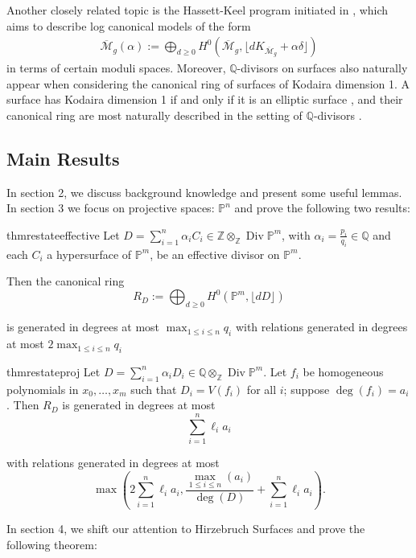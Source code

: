 \documentclass{amsart}
\theoremstyle{plain}
\theoremstyle{definition}
\theoremstyle{remark}
\numberwithin{equation}{section}
\newcommand\ssec{\subsection}
\newcommand\bq{{\mathbb Q}}
\newcommand\bp{{\mathbb P}}
\newcommand\bz{{\mathbb Z}}
\DeclareMathOperator\di{Div}
\newcommand\bida{a}
\begin{document}
Another closely related topic is the Hassett-Keel program 
initiated in \cite{hassett:classical-and-minimal-models}, which aims to describe log canonical models of the form
\begin{align*}
	\overline {\mathscr M}_g(\alpha) := \bigoplus_{d \geq 0}H^0 \left(
	\overline {\mathscr M}_g, \lfloor d K_{\overline{\mathscr M}_g} +
	\alpha\delta \rfloor  \right) 
\end{align*}
in terms of certain moduli spaces. Moreover, $\bq$-divisors on surfaces also naturally
appear when considering the canonical ring of surfaces of Kodaira dimension 1.
A surface has Kodaira dimension 1 if and only if it is an elliptic surface \cite[p. 244]{
barthHPV:compactComplexSurfaces}, and
their canonical ring are most naturally described in the setting of
$\bq$-divisors \cite[Chapter V, Theorem 12.1]{barthHPV:compactComplexSurfaces}. 

\ssec{Main Results}

In section 2, we discuss background knowledge and present some useful lemmas.  In section 3 we focus on projective spaces: $\mathbb{P}^n$ and prove the following two results:
\begin{restatable}{thm}{restateeffective}
\label{thm:proj-effective-intro}
Let $D = \sum_{i = 1}^{n} \alpha_i C_i \in \bz \otimes_\bz \di \bp^m$, with $\alpha_i =
\frac{p_i}{q_i} \in \bq$ and each $C_i$ a hypersurface of
$\bp^m$, be an effective divisor on $\bp^m$.

Then the canonical ring
\[
	R_D := \bigoplus_{d \geq 0} H^0(\bp^m, \lfloor dD \rfloor)
\]

\noindent
is generated in degrees at most $\max_{1 \leq i \leq n}{q_i}$ with
relations generated in degrees at most $2 \max_{1 \leq i \leq n}{q_i}$
\end{restatable}

\begin{restatable}{thm}{restateproj}
\label{thm:proj-generators-relations}
Let $D = \sum_{i=1}^n \alpha_i D_i \in \bq \otimes_\bz \di \bp^m$. Let
$f_i$ be homogeneous polynomials in $x_0, \ldots, x_m$ such that
$D_i = V(f_i)$ for all $i$; suppose $\deg(f_i) = a_i$. 
Then $R_D$ is generated in degrees at most 
\[
	\sum_{i=1}^n \ell_i a_i
\]

\noindent
with relations generated in degrees at most
\[
	\max \left(2 \sum_{i=1}^n \ell_i a_i, \frac{\max_{1\le i \le n}
	(	\bida_i)}{\deg(D)} + \sum_{i=1}^n \ell_i a_i \right).
\]
\end{restatable}

\noindent
In section 4, we shift our attention to Hirzebruch Surfaces and prove the following theorem:
\end{document}
